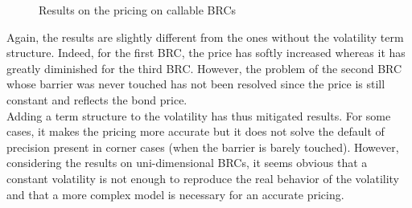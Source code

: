 \documentclass[a4paper,11pt,english]{book}
\begin{document}
\begin{figure}[H]
\begin{minipage}[b]{0.6\textwidth}
\end{minipage}
\begin{minipage}[b]{0.5\textwidth}
\end{minipage}
\caption{Results on the pricing on callable BRCs}
\label{fig:results-multi-BRC-pricing-delourgo}
\end{figure}

\newpage
Again, the results are slightly different from the ones without the volatility term structure. Indeed, for the first BRC, the price has softly increased whereas it has greatly diminished for the third BRC. However, the problem of the second BRC whose barrier was never touched has not been resolved since the price is still constant and reflects the bond price.\\

Adding a term structure to the volatility has thus mitigated results. For some cases, it makes the pricing more accurate but it does not solve the default of precision present in corner cases (when the barrier is barely touched). However, considering the results on uni-dimensional BRCs, it seems obvious that a constant volatility is not enough to reproduce the real behavior of the volatility and that a more complex model is necessary for an accurate pricing. 

\backmatter
\end{document}
